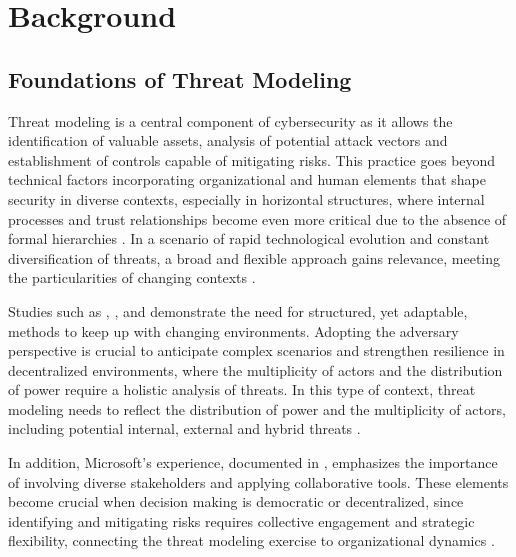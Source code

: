
%

\chapter{Background}
\label{cha:background}

\glsresetall

\section{Foundations of Threat Modeling}
\label{sec:foundations_threat_modeling}

Threat modeling is a central component of cybersecurity as it allows the
identification of valuable assets, analysis of potential attack vectors and
establishment of controls capable of mitigating risks. This practice goes beyond
technical factors incorporating organizational and human elements that shape
security in diverse contexts, especially in horizontal structures, where
internal processes and trust relationships become even more critical due to the
absence of formal hierarchies \cite{Colbac}. In a scenario of rapid
technological evolution and constant diversification of threats, a broad and
flexible approach gains relevance, meeting the particularities of changing
contexts \cite{ThreatModelingdesigningForSecurity}.

Studies such as \cite{ThreatModelingAsABasisForSecurityRequirements},
\cite{AdvancedThreatModeling}, and \cite{DemystifyingTheThreatModelingProcess}
demonstrate the need for structured, yet adaptable, methods to keep up with
changing environments. Adopting the adversary perspective
\cite{AHybridThreatModelingMethod} is crucial to anticipate complex scenarios
and strengthen resilience in decentralized environments, where the multiplicity
of actors and the distribution of power require a holistic analysis of threats.
In this type of context, threat modeling needs to reflect the distribution of
power and the multiplicity of actors, including potential internal, external and
hybrid threats \cite{ThreatModelingASummaryOfAvailableMethods}.

In addition, Microsoft's experience, documented in
\cite{ExperiencesThreatModelingAtMicrosoft}, emphasizes the importance of
involving diverse stakeholders and applying collaborative tools. These elements
become crucial when decision making is democratic or decentralized, since
identifying and mitigating risks requires collective engagement and strategic
flexibility, connecting the threat modeling exercise to organizational dynamics
\cite{ParticipatoryThreatModelling}.

